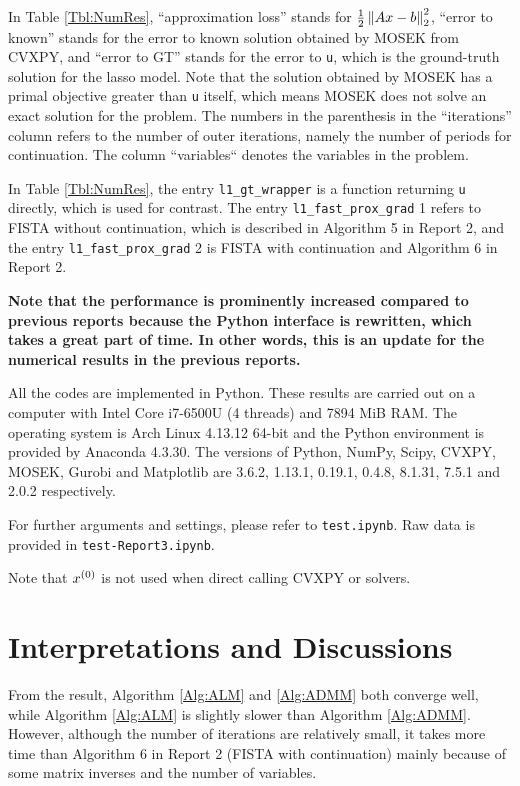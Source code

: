 \documentclass[english]{pkupaper}
\begin{document}
In Table \ref{Tbl:NumRes}, ``approximation loss'' stands for $ \frac{1}{2} \left\|  A x - b  \right\|_2^2 $, ``error to known'' stands for the error to known solution obtained by MOSEK from CVXPY, and ``error to GT'' stands for the error to \verb"u", which is the ground-truth solution for the lasso model. Note that the solution obtained by MOSEK has a primal objective greater than \verb"u" itself, which means MOSEK does not solve an exact solution for the problem. The numbers in the parenthesis in the ``iterations'' column refers to the number of outer iterations, namely the number of periods for continuation. The column ``variables`` denotes the variables in the problem.

In Table \ref{Tbl:NumRes}, the entry \verb"l1_gt_wrapper" is a function returning \verb"u" directly, which is used for contrast. The entry \verb"l1_fast_prox_grad" 1 refers to FISTA without continuation, which is described in Algorithm 5 in Report 2, and the entry \verb"l1_fast_prox_grad" 2 is FISTA with continuation and Algorithm 6 in Report 2.

\textbf{Note that the performance is prominently increased compared to previous reports because the Python interface is rewritten, which takes a great part of time. In other words, this is an update for the numerical results in the previous reports.}

All the codes are implemented in Python. These results are carried out on a computer with Intel Core i7-6500U (4 threads) and 7894 MiB RAM. The operating system is Arch Linux 4.13.12 64-bit and the Python environment is provided by Anaconda 4.3.30. The versions of Python, NumPy, Scipy, CVXPY, MOSEK, Gurobi and Matplotlib are 3.6.2, 1.13.1, 0.19.1, 0.4.8, 8.1.31, 7.5.1 and 2.0.2 respectively.

For further arguments and settings, please refer to \verb"test.ipynb". Raw data is provided in \verb"test-Report3.ipynb".

Note that $x^{\left( 0 \right)}$ is not used when direct calling CVXPY or solvers.

\section{Interpretations and Discussions}

From the result, Algorithm \ref{Alg:ALM} and \ref{Alg:ADMM} both converge well, while Algorithm \ref{Alg:ALM} is slightly slower than Algorithm \ref{Alg:ADMM}. However, although the number of iterations are relatively small, it takes more time than Algorithm 6 in Report 2 (FISTA with continuation) mainly because of some matrix inverses and the number of variables.
\end{document}
